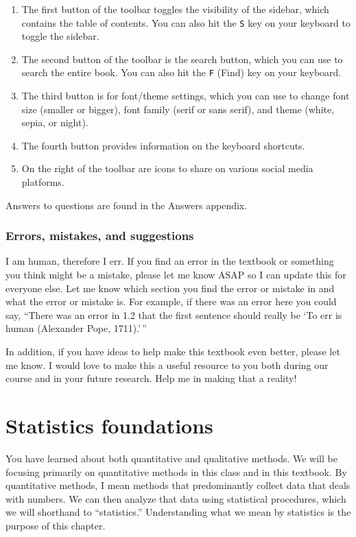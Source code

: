 \documentclass[
]{book}
\begin{document}
\begin{enumerate}
\def\labelenumi{\arabic{enumi}.}
\item
  The first button of the toolbar toggles the visibility of the sidebar, which contains the table of contents. You can also hit the \texttt{S} key on your keyboard to toggle the sidebar.
\item
  The second button of the toolbar is the search button, which you can use to search the entire book. You can also hit the \texttt{F} (Find) key on your keyboard.
\item
  The third button is for font/theme settings, which you can use to change font size (smaller or bigger), font family (serif or sans serif), and theme (white, sepia, or night).
\item
  The fourth button provides information on the keyboard shortcuts.
\item
  On the right of the toolbar are icons to share on various social media platforms.
\end{enumerate}

Answers to questions are found in the Answers appendix.

\hypertarget{errors-mistakes-and-suggestions}{%
\subsection{Errors, mistakes, and suggestions}\label{errors-mistakes-and-suggestions}}

I am human, therefore I err. If you find an error in the textbook or something you think might be a mistake, please let me know ASAP so I can update this for everyone else. Let me know which section you find the error or mistake in and what the error or mistake is. For example, if there was an error here you could say, ``There was an error in 1.2 that the first sentence should really be `To err is human (Alexander Pope, 1711).'\,''

In addition, if you have ideas to help make this textbook even better, please let me know. I would love to make this a useful resource to you both during our course and in your future research. Help me in making that a reality!

\hypertarget{statistics-foundations}{%
\chapter{Statistics foundations}\label{statistics-foundations}}

You have learned about both quantitative and qualitative methods. We will be focusing primarily on quantitative methods in this class and in this textbook. By quantitative methods, I mean methods that predominantly collect data that deals with numbers. We can then analyze that data using statistical procedures, which we will shorthand to ``statistics.'' Understanding what we mean by statistics is the purpose of this chapter.
\end{document}

